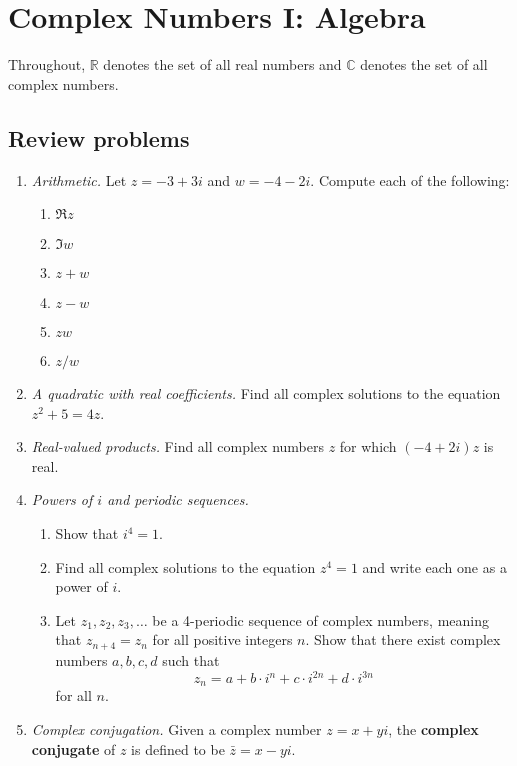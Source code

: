 \section{Complex Numbers I: Algebra}

Throughout, $\mathbb{R}$ denotes the set of all real numbers and $\mathbb{C}$ denotes the set of all complex numbers.

\subsection{Review problems}

\begin{enumerate}
\item \emph{Arithmetic.} Let $z = -3 + 3i$ and $w = -4 - 2i$. Compute each of the following:
\begin{enumerate}
\item $\Re z$
\item $\Im w$
\item $z + w$
\item $z - w$
\item $zw$
\item $z/w$
\end{enumerate}
\item \emph{A quadratic with real coefficients.} Find all complex solutions to the equation $z^2 + 5 = 4z$.
\item \emph{Real-valued products.} Find all complex numbers $z$ for which $(-4 + 2i)z$ is real.
\item \emph{Powers of $i$ and periodic sequences.}
\begin{enumerate}
\item Show that $i^4 = 1$.
\item Find all complex solutions to the equation $z^4 = 1$ and write each one as a power of $i$.
\item Let $z_1, z_2, z_3, \ldots$ be a 4-periodic sequence of complex numbers, meaning that $z_{n + 4} = z_n$ for all positive integers $n$. Show that there exist complex numbers $a,b,c,d$ such that
\begin{equation*}
z_n = a + b\cdot i^n + c\cdot i^{2n} + d\cdot i^{3n}
\end{equation*}
for all $n$.
\end{enumerate}
\item \emph{Complex conjugation.} Given a complex number $z = x + yi$, the \textbf{complex conjugate} of $z$ is defined to be $\bar{z} = x - yi$.
\begin{enumerate}

\end{enumerate}
\end{enumerate}
